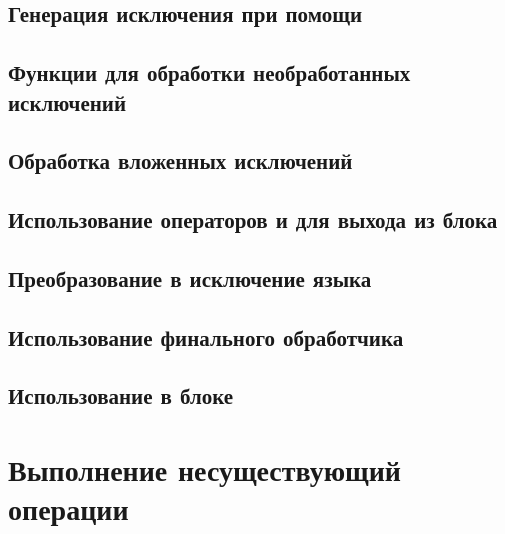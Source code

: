 
\subsection{Генерация исключения при помощи }


\subsection{Функции для обработки необработанных исключений}


\subsection{Обработка вложенных исключений}


\subsection{Использование операторов  и  для выхода из блока }
\label{sec:gotoleave}


\subsection{Преобразование в исключение языка }


\subsection{Использование финального обработчика }


\subsection{Использование  в блоке }


\newpage

\section{Выполнение несуществующий операции}

